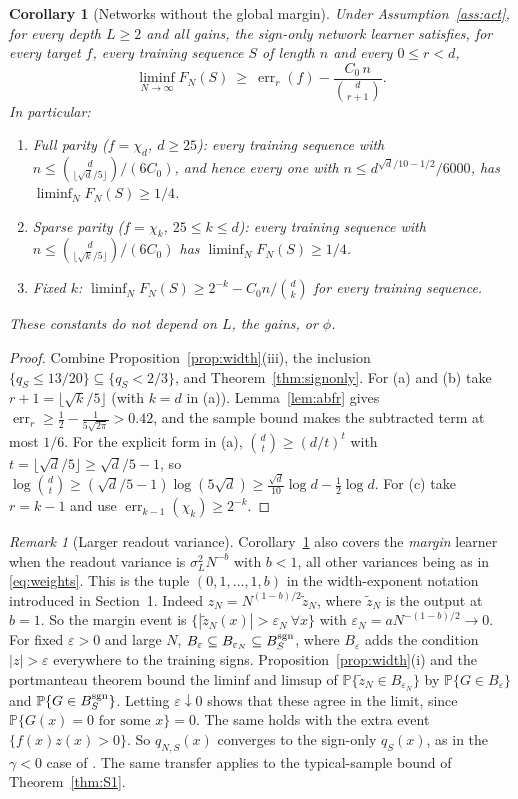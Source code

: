 \documentclass[11pt]{article}
\newtheorem{corollary}[theorem]{Corollary}
\theoremstyle{definition}\newtheorem{assumption}[theorem]{Assumption}
\theoremstyle{remark}\newtheorem{remark}[theorem]{Remark}
\DeclareMathOperator{\err}{err}
\newcommand{\Pp}{\mathbb P}
\begin{document}
\begin{corollary}[Networks without the global margin]\label{cor:signonly}
Under Assumption~\ref{ass:act}, for every depth $L\ge2$ and all gains, the
sign-only network learner satisfies, for every target $f$, every training
sequence $S$ of length $n$ and every $0\le r<d$,
\[
 \liminf_{N\to\infty}F_N(S)\ \ge\ \err_r(f)-\frac{C_0\,n}{\binom d{r+1}}.
\]
In particular:
\begin{enumerate}
\item[(a)] \emph{Full parity} ($f=\chi_d$, $d\ge25$): every training
sequence with $n\le\binom d{\lfloor\sqrt d/5\rfloor}/(6C_0)$, and hence every
one with $n\le d^{\sqrt d/10-1/2}/6000$, has $\liminf_NF_N(S)\ge1/4$.
\item[(b)] \emph{Sparse parity} ($f=\chi_k$, $25\le k\le d$): every training
sequence with $n\le\binom d{\lfloor\sqrt k/5\rfloor}/(6C_0)$ has
$\liminf_NF_N(S)\ge1/4$.
\item[(c)] \emph{Fixed $k$}: $\liminf_NF_N(S)\ge2^{-k}-C_0n/\binom dk$ for
every training sequence.
\end{enumerate}
These constants do not depend on $L$, the gains, or $\phi$.
\end{corollary}
\begin{proof}
Combine Proposition~\ref{prop:width}(iii), the inclusion
$\{q_S\le13/20\}\subseteq\{q_S<2/3\}$, and Theorem~\ref{thm:signonly}.
For (a) and (b) take $r+1=\lfloor\sqrt k/5\rfloor$ (with $k=d$ in (a)).
Lemma~\ref{lem:abfr} gives $\err_r\ge\frac12-\frac1{5\sqrt{2\pi}}>0.42$,
and the sample bound makes the subtracted term at most $1/6$. For the
explicit form in (a), $\binom dt\ge(d/t)^t$ with
$t=\lfloor\sqrt d/5\rfloor\ge\sqrt d/5-1$, so
$\log\binom dt\ge(\sqrt d/5-1)\log(5\sqrt d)\ge\frac{\sqrt d}{10}\log d
-\frac12\log d$. For (c) take $r=k-1$ and use $\err_{k-1}(\chi_k)\ge2^{-k}$.
\end{proof}

\begin{remark}[Larger readout variance]\label{rem:readout}
Corollary~\ref{cor:signonly} also covers the \emph{margin} learner when
the readout variance is $\sigma_L^2N^{-b}$ with $b<1$, all other variances
being as in \eqref{eq:weights}. This is the tuple $(0,1,\ldots,1,b)$ in the
width-exponent notation introduced in Section~1. Indeed $z_N=N^{(1-b)/2}\tilde z_N$, where
$\tilde z_N$ is the output at $b=1$. So the margin event is
$\{|\tilde z_N(x)|>\varepsilon_N\ \forall x\}$ with
$\varepsilon_N=aN^{-(1-b)/2}\to0$. For fixed $\varepsilon>0$ and large $N$,
$B_\varepsilon\subseteq B_{\varepsilon_N}\subseteq B^{\rm sgn}_S$, where
$B_\varepsilon$ adds the condition $|z|>\varepsilon$ everywhere to the
training signs. Proposition~\ref{prop:width}(i) and the portmanteau theorem
bound the liminf and limsup of $\Pp\{\tilde z_N\in B_{\varepsilon_N}\}$ by
$\Pp\{G\in B_\varepsilon\}$ and $\Pp\{G\in B^{\rm sgn}_S\}$. Letting
$\varepsilon\downarrow0$ shows that these agree in the limit, since
$\Pp\{G(x)=0\text{ for some }x\}=0$. The same holds with the extra event
$\{f(x)z(x)>0\}$. So $q_{N,S}(x)$ converges to the sign-only $q_S(x)$, as in
the $\gamma<0$ case of \cite[Proposition~2.2]{subcritical}. The same
transfer applies to the typical-sample bound of Theorem~\ref{thm:S1}.
\end{remark}
\end{document}
